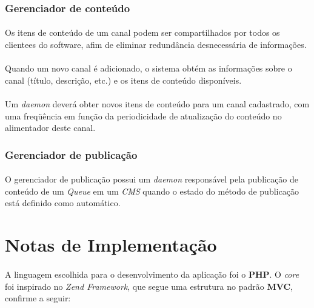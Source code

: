 \documentclass[a4paper,12pt]{article}
\def\cms{\emph{CMS}}
\def\queue{\emph{Queue}}
\begin{document}
\subsubsection{Gerenciador de conteúdo} \label{gerenciadorconteudo}

\paragraph{}
Os itens de conteúdo de um canal podem ser compartilhados por todos os
clientees do software, afim de eliminar redundância desnecessária de
informações.

\paragraph{}
Quando um novo canal é adicionado, o sistema obtém as informações sobre o canal
(título, descrição, etc.) e os itens de conteúdo disponíveis.

\paragraph{}
Um \emph{daemon} deverá obter novos itens de conteúdo para um canal cadastrado,
com uma freqüência em função da periodicidade de atualização do conteúdo no
alimentador deste canal.

\subsubsection{Gerenciador de publicação} \label{gerenciadorpublicacao}

\paragraph{}
O gerenciador de publicação possui um \emph{daemon} responsável pela publicação
de conteúdo de um \queue{} em um \cms{} quando o estado do método de publicação
está definido como automático. 

\section{Notas de Implementação}

\paragraph{}
A linguagem escolhida para o desenvolvimento da aplicação foi o \textbf{PHP}. O \emph{core} foi inspirado no \emph{Zend Framework}, que segue uma estrutura no padrão \textbf{MVC}, confirme a seguir:
\end{document}
